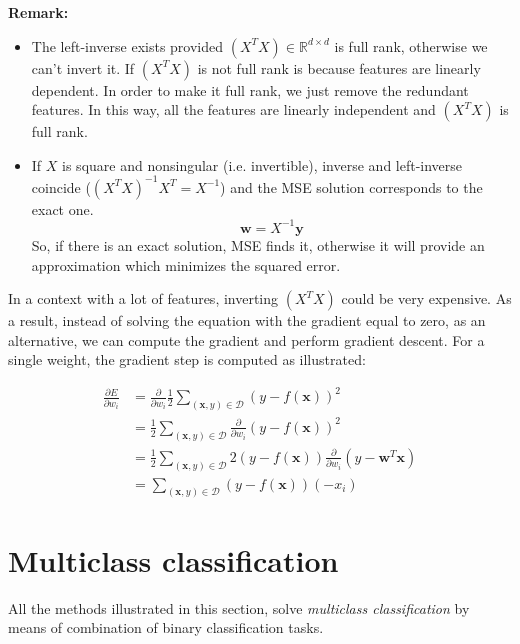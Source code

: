 \textbf{Remark:}
\begin{itemize}
	\item The left-inverse exists provided $(X^{T}X)\in \mathbb{R}^{d \times d}$ is
		full rank, otherwise we can't invert it. If $(X^{T}X)$ is not full rank is because
		features are linearly dependent. In order to make it full rank, we just remove
		the redundant features. In this way, all the features are linearly independent
		and $(X^{T}X)$ is full rank.

	\item If $X$ is square and nonsingular (i.e. invertible), inverse and left-inverse
		coincide ($(X^{T}X)^{-1}X^{T}= X^{-1}$) and the MSE solution corresponds to the
		exact one.
		\[
			\pmb{w}= X^{-1}\pmb{y}
		\]
		So, if there is an exact solution, MSE finds it, otherwise it will provide an
		approximation which minimizes the squared error.
\end{itemize}

In a context with a lot of features, inverting $(X^{T}X)$ could be very expensive.
As a result, instead of solving the equation with the gradient equal to zero, as
an alternative, we can compute the gradient and perform gradient descent. For a
single weight, the gradient step is computed as illustrated:

\[
	\begin{aligned}
		\frac{\partial E}{\partial w_i} & =\frac{\partial}{\partial w_i}\frac{1}{2}\sum_{(\boldsymbol{x}, y) \in \mathcal{D}}(y-f(\boldsymbol{x}))^{2}                                               \\
		                                & =\frac{1}{2}\sum_{(\boldsymbol{x}, y) \in \mathcal{D}}\frac{\partial}{\partial w_i}(y-f(\boldsymbol{x}))^{2}                                               \\
		                                & =\frac{1}{2}\sum_{(\boldsymbol{x}, y) \in \mathcal{D}}2(y-f(\boldsymbol{x})) \frac{\partial}{\partial w_i}\left(y-\boldsymbol{w}^{T} \boldsymbol{x}\right) \\
		                                & =\sum_{(\boldsymbol{x}, y) \in \mathcal{D}}(y-f(\boldsymbol{x}))\left(-x_{i}\right)
	\end{aligned}
\]

\section{Multiclass classification}
All the methods illustrated in this section, solve \textit{multiclass
classification} by means of combination of binary classification tasks.
\newline

